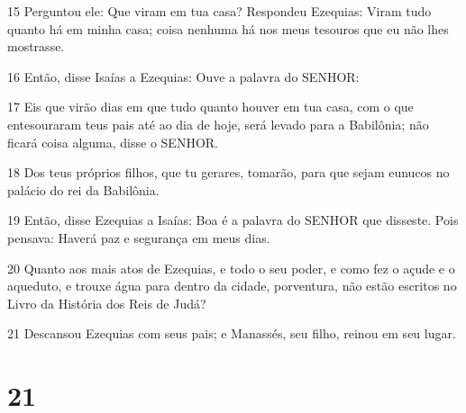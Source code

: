\par 15 Perguntou ele: Que viram em tua casa? Respondeu Ezequias: Viram tudo quanto há em minha casa; coisa nenhuma há nos meus tesouros que eu não lhes mostrasse.
\par 16 Então, disse Isaías a Ezequias: Ouve a palavra do SENHOR:
\par 17 Eis que virão dias em que tudo quanto houver em tua casa, com o que entesouraram teus pais até ao dia de hoje, será levado para a Babilônia; não ficará coisa alguma, disse o SENHOR.
\par 18 Dos teus próprios filhos, que tu gerares, tomarão, para que sejam eunucos no palácio do rei da Babilônia.
\par 19 Então, disse Ezequias a Isaías: Boa é a palavra do SENHOR que disseste. Pois pensava: Haverá paz e segurança em meus dias.
\par 20 Quanto aos mais atos de Ezequias, e todo o seu poder, e como fez o açude e o aqueduto, e trouxe água para dentro da cidade, porventura, não estão escritos no Livro da História dos Reis de Judá?
\par 21 Descansou Ezequias com seus pais; e Manassés, seu filho, reinou em seu lugar.

\chapter{21}

